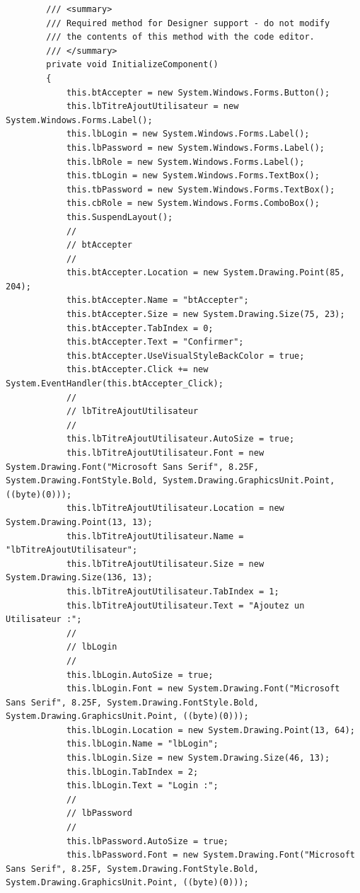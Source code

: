 \documentclass[main.tex]{subfiles}
\begin{document}
\begin{lstlisting}
        /// <summary>
        /// Required method for Designer support - do not modify
        /// the contents of this method with the code editor.
        /// </summary>
        private void InitializeComponent()
        {
            this.btAccepter = new System.Windows.Forms.Button();
            this.lbTitreAjoutUtilisateur = new System.Windows.Forms.Label();
            this.lbLogin = new System.Windows.Forms.Label();
            this.lbPassword = new System.Windows.Forms.Label();
            this.lbRole = new System.Windows.Forms.Label();
            this.tbLogin = new System.Windows.Forms.TextBox();
            this.tbPassword = new System.Windows.Forms.TextBox();
            this.cbRole = new System.Windows.Forms.ComboBox();
            this.SuspendLayout();
            // 
            // btAccepter
            // 
            this.btAccepter.Location = new System.Drawing.Point(85, 204);
            this.btAccepter.Name = "btAccepter";
            this.btAccepter.Size = new System.Drawing.Size(75, 23);
            this.btAccepter.TabIndex = 0;
            this.btAccepter.Text = "Confirmer";
            this.btAccepter.UseVisualStyleBackColor = true;
            this.btAccepter.Click += new System.EventHandler(this.btAccepter_Click);
            // 
            // lbTitreAjoutUtilisateur
            // 
            this.lbTitreAjoutUtilisateur.AutoSize = true;
            this.lbTitreAjoutUtilisateur.Font = new System.Drawing.Font("Microsoft Sans Serif", 8.25F, System.Drawing.FontStyle.Bold, System.Drawing.GraphicsUnit.Point, ((byte)(0)));
            this.lbTitreAjoutUtilisateur.Location = new System.Drawing.Point(13, 13);
            this.lbTitreAjoutUtilisateur.Name = "lbTitreAjoutUtilisateur";
            this.lbTitreAjoutUtilisateur.Size = new System.Drawing.Size(136, 13);
            this.lbTitreAjoutUtilisateur.TabIndex = 1;
            this.lbTitreAjoutUtilisateur.Text = "Ajoutez un Utilisateur :";
            // 
            // lbLogin
            // 
            this.lbLogin.AutoSize = true;
            this.lbLogin.Font = new System.Drawing.Font("Microsoft Sans Serif", 8.25F, System.Drawing.FontStyle.Bold, System.Drawing.GraphicsUnit.Point, ((byte)(0)));
            this.lbLogin.Location = new System.Drawing.Point(13, 64);
            this.lbLogin.Name = "lbLogin";
            this.lbLogin.Size = new System.Drawing.Size(46, 13);
            this.lbLogin.TabIndex = 2;
            this.lbLogin.Text = "Login :";
            // 
            // lbPassword
            // 
            this.lbPassword.AutoSize = true;
            this.lbPassword.Font = new System.Drawing.Font("Microsoft Sans Serif", 8.25F, System.Drawing.FontStyle.Bold, System.Drawing.GraphicsUnit.Point, ((byte)(0)));

\end{lstlisting}
\end{document}
